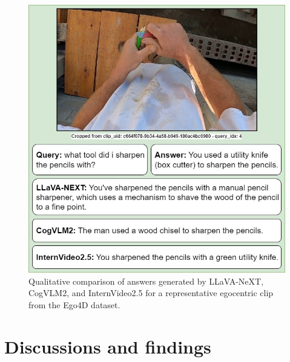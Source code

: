 \documentclass[10pt,twocolumn,letterpaper]{article}
\begin{document}
	\begin{figure}[h] %
			\centering
			\includegraphics[width=\columnwidth]{VLMs_Qualitative.jpg} %
			\caption{Qualitative comparison of answers generated by LLaVA-NeXT, CogVLM2, and InternVideo2.5 for a representative egocentric clip from the Ego4D dataset.}
			\label{fig:VLMs_Qualitative}
		\end{figure}
	
	
\section{Discussions and findings}
	
\end{document}
